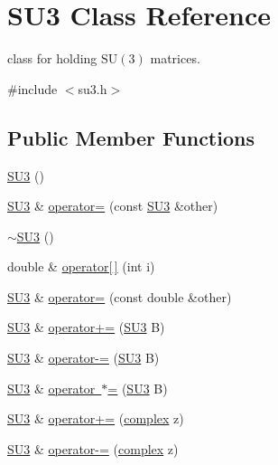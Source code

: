 \hypertarget{class_s_u3}{}\section{S\+U3 Class Reference}
\label{class_s_u3}


class for holding $\mathrm{SU}(3)$ matrices.  




{\ttfamily \#include $<$su3.\+h$>$}

\subsection*{Public Member Functions}
\begin{DoxyCompactItemize}
\item 
\mbox{\hyperlink{class_s_u3_a79a4b45ff8cbe77f1f90a108971f822d}{S\+U3}} ()
\item 
\mbox{\hyperlink{class_s_u3}{S\+U3}} \& \mbox{\hyperlink{class_s_u3_a722bf7fb87348f75132cd1d25922d9f5}{operator=}} (const \mbox{\hyperlink{class_s_u3}{S\+U3}} \&other)
\item 
\mbox{\hyperlink{class_s_u3_af1e314363e80a0404023494937c56afa}{$\sim$\+S\+U3}} ()
\item 
double \& \mbox{\hyperlink{class_s_u3_a44d830566de4abc27eeea8dd338b0528}{operator\mbox{[}$\,$\mbox{]}}} (int i)
\item 
\mbox{\hyperlink{class_s_u3}{S\+U3}} \& \mbox{\hyperlink{class_s_u3_a16a4af3fc6b84d512c4a0ffd5aefaa87}{operator=}} (const double \&other)
\item 
\mbox{\hyperlink{class_s_u3}{S\+U3}} \& \mbox{\hyperlink{class_s_u3_aa22070a659e60ee2e252002106e375cb}{operator+=}} (\mbox{\hyperlink{class_s_u3}{S\+U3}} B)
\item 
\mbox{\hyperlink{class_s_u3}{S\+U3}} \& \mbox{\hyperlink{class_s_u3_a6edde88f3b6af05b8b5c3cc7415862b9}{operator-\/=}} (\mbox{\hyperlink{class_s_u3}{S\+U3}} B)
\item 
\mbox{\hyperlink{class_s_u3}{S\+U3}} \& \mbox{\hyperlink{class_s_u3_a499ee2a922f1568eee9fe2e04d8cbe89}{operator $\ast$=}} (\mbox{\hyperlink{class_s_u3}{S\+U3}} B)
\item 
\mbox{\hyperlink{class_s_u3}{S\+U3}} \& \mbox{\hyperlink{class_s_u3_a0dbe4da7ba00c8712e294984f9cbc0a8}{operator+=}} (\mbox{\hyperlink{classcomplex}{complex}} z)
\item 
\mbox{\hyperlink{class_s_u3}{S\+U3}} \& \mbox{\hyperlink{class_s_u3_ab86d0576a1029b0ae58fea437c4606aa}{operator-\/=}} (\mbox{\hyperlink{classcomplex}{complex}} z)

\end{DoxyCompactItemize}
